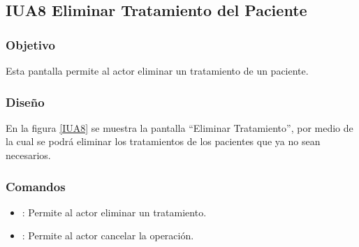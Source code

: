 \subsection{IUA8 Eliminar Tratamiento del Paciente}
 
\subsubsection{Objetivo}

    Esta pantalla permite al actor eliminar un tratamiento de un paciente.

\subsubsection{Diseño}

    En la figura \ref{IUA8} se muestra la pantalla ``Eliminar Tratamiento'', por medio de la cual se podrá eliminar los tratamientos de los pacientes que ya no sean necesarios. \\
\newpage

\subsubsection{Comandos}
\begin{itemize}
    \item {}: Permite al actor eliminar un tratamiento.
    \item {}: Permite al actor cancelar la operación.
    
\end{itemize}

%
